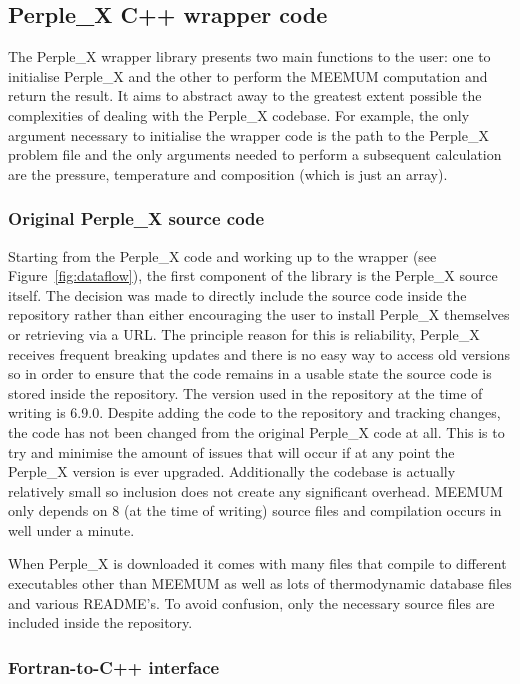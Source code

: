 \subsection{Perple\_X C++ wrapper code}

The Perple\_X wrapper library presents two main functions to the user: one to initialise Perple\_X and the other to perform the MEEMUM computation and return the result.
It aims to abstract away to the greatest extent possible the complexities of dealing with the Perple\_X codebase.
For example, the only argument necessary to initialise the wrapper code is the path to the Perple\_X problem file and the only arguments needed to perform a subsequent calculation are the pressure, temperature and composition (which is just an array).

\subsubsection{Original Perple\_X source code}

Starting from the Perple\_X code and working up to the wrapper (see Figure~\ref{fig:dataflow}), the first component of the library is the Perple\_X source itself.
The decision was made to directly include the source code inside the repository rather than either encouraging the user to install Perple\_X themselves or retrieving via a URL.
The principle reason for this is reliability, Perple\_X receives frequent breaking updates and there is no easy way to access old versions so in order to ensure that the code remains in a usable state the source code is stored inside the repository.
The version used in the repository at the time of writing is 6.9.0.
Despite adding the code to the repository and tracking changes, the code has not been changed from the original Perple\_X code at all.
This is to try and minimise the amount of issues that will occur if at any point the Perple\_X version is ever upgraded.
Additionally the codebase is actually relatively small so inclusion does not create any significant overhead.
MEEMUM only depends on 8 (at the time of writing) source files and compilation occurs in well under a minute.

When Perple\_X is downloaded it comes with many files that compile to different executables other than MEEMUM as well as lots of thermodynamic database files and various README's.
To avoid confusion, only the necessary source files are included inside the repository.

\subsubsection{Fortran-to-C++ interface}

